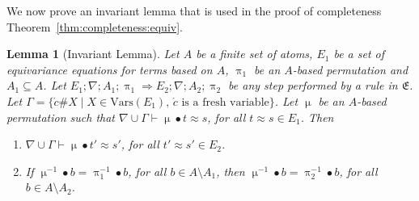 \documentclass[11pt,a4paper]{amsart}
\newtheorem{lemma}{Lemma}
\theoremstyle{definition}
\newcommand{\Lra}{\Longrightarrow}
\newcommand{\vars}{\mathrm{Vars}}
\newcommand{\perm}{\approx}
\newcommand{\permef}{\bullet}
\newcommand\ppi{\uppi}
\newcommand\pmu{\upmu}
\newcommand{\msys}{\mathfrak{E}}
\newcommand{\fresh}[1]{{\acute{#1}}}
\begin{document}
We now prove an invariant lemma that is used in the proof of
completeness Theorem~\ref{thm:completeness:equiv}.




\begin{lemma}[Invariant Lemma]
  \label{lem:invariant}
  Let $A$ be a finite set of atoms, $E_1$ be a set of equivariance
  equations for terms based on $A$, $\ppi_1$ be an $A$-based
  permutation and $A_1\subseteq A$.  Let $E_1;\nabla;A_1;\ppi_1\Lra
  E_2;\nabla;A_2;\ppi_2$ be any step performed by a rule in $\msys$.
  Let $\Gamma = \{\fresh{c}\#X\mid X\in\vars(E_1),\, \mbox{$\fresh{c}$ is
    a fresh variable}\}$.  Let $\pmu$ be an $A$-based permutation such
  that $\nabla\cup\Gamma \vdash \pmu\permef t \approx s$, for all $t\perm s\in
  E_1$. Then
\begin{enumerate}
  \item\label{item:inv:1} $\nabla\cup\Gamma  \vdash \pmu \permef t'
    \approx s' $, for all $t'\perm
    s'\in E_2$.
  \item\label{item:inv:2} If $\pmu^{-1} \permef b = \ppi_1^{-1}
    \permef b$, for all $b \in A \setminus A_1$, then $\pmu^{-1}
    \permef b = \ppi_2^{-1} \permef b$, for all $b \in A \setminus
    A_2$.
\end{enumerate}
\end{lemma}
\end{document}
